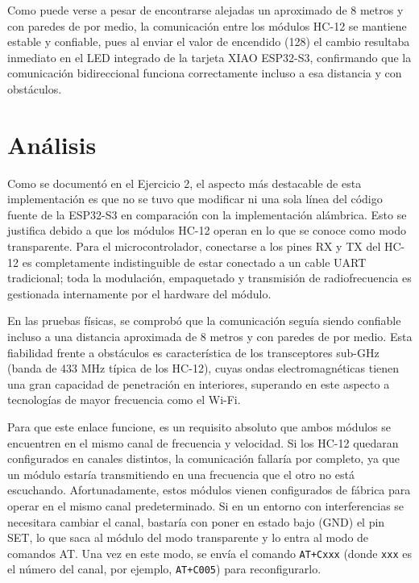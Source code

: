 \documentclass[12pt, letterpaper]{article}
\begin{document}
Como puede verse a pesar de encontrarse alejadas un aproximado de 8 metros y con paredes de por medio, la comunicación entre los módulos HC-12 se mantiene estable y confiable, pues al enviar el valor de encendido (128) el cambio resultaba inmediato en el LED integrado de la tarjeta XIAO ESP32-S3, confirmando que la comunicación bidireccional funciona correctamente incluso a esa distancia y con obstáculos.

\section*{\centering \fontsize{14}{17}\sffamily\selectfont Análisis}

Como se documentó en el Ejercicio 2, el aspecto más destacable de esta implementación es que no se tuvo que modificar ni una sola línea del código fuente de la ESP32-S3 en comparación con la implementación alámbrica. Esto se justifica debido a que los módulos HC-12 operan en lo que se conoce como modo transparente. Para el microcontrolador, conectarse a los pines RX y TX del HC-12 es completamente indistinguible de estar conectado a un cable UART tradicional; toda la modulación, empaquetado y transmisión de radiofrecuencia es gestionada internamente por el hardware del módulo.

En las pruebas físicas, se comprobó que la comunicación seguía siendo confiable incluso a una distancia aproximada de 8 metros y con paredes de por medio. Esta fiabilidad frente a obstáculos es característica de los transceptores sub-GHz (banda de 433 MHz típica de los HC-12), cuyas ondas electromagnéticas tienen una gran capacidad de penetración en interiores, superando en este aspecto a tecnologías de mayor frecuencia como el Wi-Fi.

Para que este enlace funcione, es un requisito absoluto que ambos módulos se encuentren en el mismo canal de frecuencia y velocidad. Si los HC-12 quedaran configurados en canales distintos, la comunicación fallaría por completo, ya que un módulo estaría transmitiendo en una frecuencia que el otro no está escuchando. Afortunadamente, estos módulos vienen configurados de fábrica para operar en el mismo canal predeterminado. Si en un entorno con interferencias se necesitara cambiar el canal, bastaría con poner en estado bajo (GND) el pin SET, lo que saca al módulo del modo transparente y lo entra al modo de comandos AT. Una vez en este modo, se envía el comando \texttt{AT+Cxxx} (donde \texttt{xxx} es el número del canal, por ejemplo, \texttt{AT+C005}) para reconfigurarlo.
\end{document}
